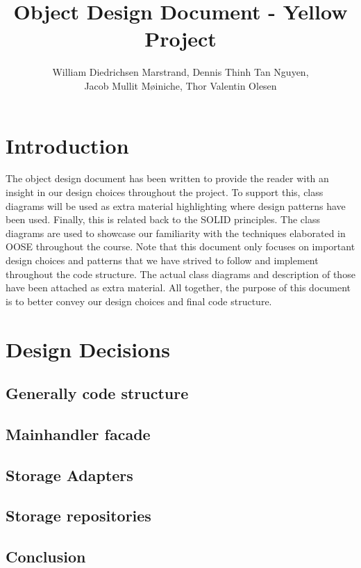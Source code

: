 \documentclass{article}
\title{Object Design Document - Yellow Project}
\author{William Diedrichsen Marstrand, Dennis Thinh Tan Nguyen, 
\\Jacob Mullit M{\o}iniche, Thor Valentin Olesen}
\begin{document}
\maketitle
\newpage
\tableofcontents
\newpage

\section{Introduction}

The object design document has been written to provide the reader with an insight in our design choices throughout the project. To support this, class diagrams will be used as extra material highlighting where design patterns have been used. Finally, this is related back to the SOLID principles. The class diagrams are used to showcase our familiarity with the techniques elaborated in OOSE throughout the course. Note that this document only focuses on important design choices and patterns that we have strived to follow and implement throughout the code structure. The actual class diagrams and description of those have been attached as extra material. All together, the purpose of this document is to better convey our design choices and final code structure. 



\section{Design Decisions}
	\subsection{Generally code structure}
		
	\subsection{Mainhandler facade}
		
	\subsection{Storage Adapters}
		
		\newpage
	\subsection{Storage repositories}
		
	\subsection{Conclusion}
		
	
\end{document}

